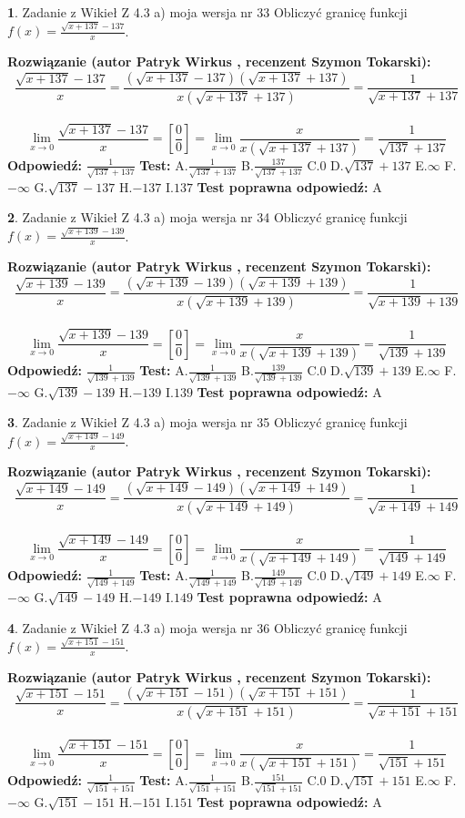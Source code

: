 \documentclass[12pt, a4paper]{article}
\theoremstyle{definition} %
\newtheorem{zad}{}
\newcommand{\zadStart}[1]{\begin{zad}#1\newline}
\newcommand{\zadStop}{\end{zad}}
\newcommand{\rozwStart}[2]{\noindent \textbf{Rozwiązanie (autor #1 , recenzent #2): }\newline}
\newcommand{\rozwStop}{\newline}
\newcommand{\odpStart}{\noindent \textbf{Odpowiedź:}\newline}
\newcommand{\odpStop}{\newline}
\newcommand{\testStart}{\noindent \textbf{Test:}\newline}
\newcommand{\testStop}{\newline}
\newcommand{\kluczStart}{\noindent \textbf{Test poprawna odpowiedź:}\newline}
\newcommand{\kluczStop}{\newline}
\begin{document}
\zadStart{Zadanie z Wikieł Z 4.3 a) moja wersja nr 33}
Obliczyć granicę funkcji $f(x)=\frac{\sqrt{x+137}-137}{x}$.
\zadStop
\rozwStart{Patryk Wirkus}{Szymon Tokarski}
$$\frac{\sqrt{x+137}-137}{x}=\frac{(\sqrt{x+137}-137)(\sqrt{x+137}+137)}{x(\sqrt{x+137}+137)}=\frac{1}{\sqrt{x+137}+137}$$
\\
$$\lim\limits_{x\to0}\frac{\sqrt{x+137}-137}{x}=[\frac{0}{0}]=
\lim\limits_{x\to0}\frac{x}{x(\sqrt{x+137}+137)} = \frac{1}{\sqrt{137}+137}$$
\rozwStop
\odpStart
$\frac{1}{\sqrt{137}+137}$
\odpStop
\testStart
A.$\frac{1}{\sqrt{137}+137}$
B.$\frac{137}{\sqrt{137}+137}$
C.$0$
D.$\sqrt{137}+137$
E.$\infty$
F.$-\infty$
G.$\sqrt{137}-137$
H.$-137$
I.$137$
\testStop
\kluczStart
A
\kluczStop



\zadStart{Zadanie z Wikieł Z 4.3 a) moja wersja nr 34}
Obliczyć granicę funkcji $f(x)=\frac{\sqrt{x+139}-139}{x}$.
\zadStop
\rozwStart{Patryk Wirkus}{Szymon Tokarski}
$$\frac{\sqrt{x+139}-139}{x}=\frac{(\sqrt{x+139}-139)(\sqrt{x+139}+139)}{x(\sqrt{x+139}+139)}=\frac{1}{\sqrt{x+139}+139}$$
\\
$$\lim\limits_{x\to0}\frac{\sqrt{x+139}-139}{x}=[\frac{0}{0}]=
\lim\limits_{x\to0}\frac{x}{x(\sqrt{x+139}+139)} = \frac{1}{\sqrt{139}+139}$$
\rozwStop
\odpStart
$\frac{1}{\sqrt{139}+139}$
\odpStop
\testStart
A.$\frac{1}{\sqrt{139}+139}$
B.$\frac{139}{\sqrt{139}+139}$
C.$0$
D.$\sqrt{139}+139$
E.$\infty$
F.$-\infty$
G.$\sqrt{139}-139$
H.$-139$
I.$139$
\testStop
\kluczStart
A
\kluczStop



\zadStart{Zadanie z Wikieł Z 4.3 a) moja wersja nr 35}
Obliczyć granicę funkcji $f(x)=\frac{\sqrt{x+149}-149}{x}$.
\zadStop
\rozwStart{Patryk Wirkus}{Szymon Tokarski}
$$\frac{\sqrt{x+149}-149}{x}=\frac{(\sqrt{x+149}-149)(\sqrt{x+149}+149)}{x(\sqrt{x+149}+149)}=\frac{1}{\sqrt{x+149}+149}$$
\\
$$\lim\limits_{x\to0}\frac{\sqrt{x+149}-149}{x}=[\frac{0}{0}]=
\lim\limits_{x\to0}\frac{x}{x(\sqrt{x+149}+149)} = \frac{1}{\sqrt{149}+149}$$
\rozwStop
\odpStart
$\frac{1}{\sqrt{149}+149}$
\odpStop
\testStart
A.$\frac{1}{\sqrt{149}+149}$
B.$\frac{149}{\sqrt{149}+149}$
C.$0$
D.$\sqrt{149}+149$
E.$\infty$
F.$-\infty$
G.$\sqrt{149}-149$
H.$-149$
I.$149$
\testStop
\kluczStart
A
\kluczStop



\zadStart{Zadanie z Wikieł Z 4.3 a) moja wersja nr 36}
Obliczyć granicę funkcji $f(x)=\frac{\sqrt{x+151}-151}{x}$.
\zadStop
\rozwStart{Patryk Wirkus}{Szymon Tokarski}
$$\frac{\sqrt{x+151}-151}{x}=\frac{(\sqrt{x+151}-151)(\sqrt{x+151}+151)}{x(\sqrt{x+151}+151)}=\frac{1}{\sqrt{x+151}+151}$$
\\
$$\lim\limits_{x\to0}\frac{\sqrt{x+151}-151}{x}=[\frac{0}{0}]=
\lim\limits_{x\to0}\frac{x}{x(\sqrt{x+151}+151)} = \frac{1}{\sqrt{151}+151}$$
\rozwStop
\odpStart
$\frac{1}{\sqrt{151}+151}$
\odpStop
\testStart
A.$\frac{1}{\sqrt{151}+151}$
B.$\frac{151}{\sqrt{151}+151}$
C.$0$
D.$\sqrt{151}+151$
E.$\infty$
F.$-\infty$
G.$\sqrt{151}-151$
H.$-151$
I.$151$
\testStop
\kluczStart
A
\kluczStop
\end{document}
